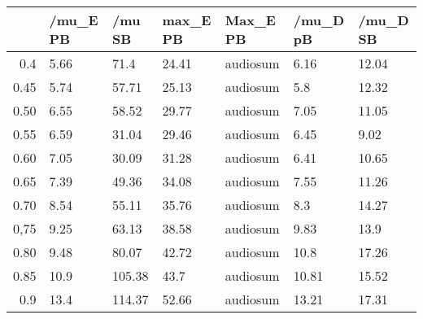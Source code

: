 \begin{table}[ht]
\centering
\begin{tabular}{rllllll}
  \hline
 & /mu\_E PB & /mu SB & max\_E PB & Max\_E PB & /mu\_D pB & /mu\_D SB \\ 
  \hline
0.4 & 5.66 & 71.4 & 24.41 & audiosum & 6.16 & 12.04 \\ 
  0.45 & 5.74 & 57.71 & 25.13 & audiosum & 5.8 & 12.32 \\ 
  0.50 & 6.55 & 58.52 & 29.77 & audiosum & 7.05 & 11.05 \\ 
  0.55 & 6.59 & 31.04 & 29.46 & audiosum & 6.45 & 9.02 \\ 
  0.60 & 7.05 & 30.09 & 31.28 & audiosum & 6.41 & 10.65 \\ 
  0.65 & 7.39 & 49.36 & 34.08 & audiosum & 7.55 & 11.26 \\ 
  0.70 & 8.54 & 55.11 & 35.76 & audiosum & 8.3 & 14.27 \\ 
  0,75 & 9.25 & 63.13 & 38.58 & audiosum & 9.83 & 13.9 \\ 
  0.80 & 9.48 & 80.07 & 42.72 & audiosum & 10.8 & 17.26 \\ 
  0.85 & 10.9 & 105.38 & 43.7 & audiosum & 10.81 & 15.52 \\ 
  0.9 & 13.4 & 114.37 & 52.66 & audiosum & 13.21 & 17.31 \\ 
   \hline
\end{tabular}
\end{table}
